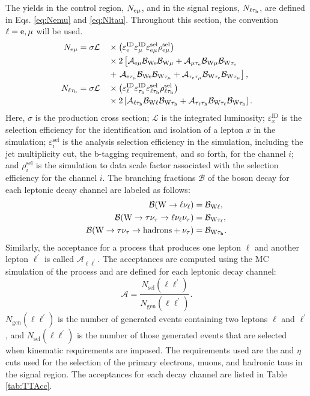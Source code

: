 The \ttbar yields in the \emu control region, $N_{\mathrm{e}\mu}$, and in the signal regions, $N_{\ell\tau_{\text{h}}}$, are defined in Eqs. \eqref{eq:Nemu} and \eqref{eq:Nltau}. Throughout this section, the convention $\ell = \mathrm{e}, \mu$ will be used.
\begin{alignat}{2}
\label{eq:Nemu}
  N_{\emu} &= \sigma \mathcal{L} &&\times \left(\Ee \Emu \varepsilon^{\text{sel}}_{\emu} \rho^{\text{sel}}_{\emu} \right)  \nonumber \\
           &                     &&\times 2 \left[\vphantom{\Btm} \Aem\Be\Bm + \Amte\Bm\Bte \right. \\
           &                     &&+ \left. \Aetm\Be\Btm  + \Atetm\Bte\Btm \right],  \nonumber \\
 N_{\ltau} &= \sigma \mathcal{L} &&\times \left(\El \Eth \varepsilon^{\text{sel}}_{\ltau} \rho^{\text{sel}}_{\ltau} \right) \nonumber \\
           &                     &&\times 2 \left[\Alth\Bl\Bth + \Atlth\Btl\Bth \right].  \label{eq:Nltau}
\end{alignat}
Here, $\sigma$ is the \ttbar production cross section; $\mathcal{L}$ is the integrated luminosity; $\varepsilon_{x}^{\text{ID}}$ is the selection efficiency for the identification and isolation of a lepton $x$ in the simulation; $\varepsilon^{\text{sel}}_{i}$ is the analysis selection efficiency in the simulation, including the jet multiplicity cut, the b-tagging requirement, and so forth, for the channel $i$; and $\rho^{\text{sel}}_{i}$ is the simulation to data scale factor associated with the selection efficiency for the channel $i$. The branching fractions $\mathcal{B}$ of the \W boson decay for each leptonic decay channel are labeled as follows:
\begin{align}
\mathcal{B}(\mathrm{W} \rightarrow \ell \nu_{\ell}) &= \mathcal{B}_{\mathrm{W}\ell}, \\
\mathcal{B}(\mathrm{W} \rightarrow \tau\nu_{\tau} \rightarrow \ell \nu_{\ell} \nu_{\tau}) &= \mathcal{B}_{\mathrm{W}\tau_{\ell}}, \\
\mathcal{B}(\mathrm{W} \rightarrow \tau\nu_{\tau} \rightarrow \text{hadrons} + \nu_{\tau}) &= \mathcal{B}_{\mathrm{W}\tau_{\text{h}}}.
\end{align}
Similarly, the acceptance for a process that produces one lepton $\ell$ and another lepton $\ell^{\prime}$ is called $\mathcal{A}_{\ell\ell^{\prime}}$. The acceptances are computed using the MC simulation of the \ttbar process and are defined for each leptonic decay channel:
\begin{equation}
  \mathcal{A} = \frac{N_{\text{sel}}(\ell\ell^{\prime})}{N_{\text{gen}}(\ell\ell^{\prime})}.
\end{equation}
$N_{\text{gen}}(\ell\ell^{\prime})$ is the number of generated events containing two leptons $\ell$ and $\ell^{\prime}$, and $N_{\text{sel}}(\ell\ell^{\prime})$ is the number of those generated events that are selected when kinematic requirements are imposed. The requirements used are the \pt and $\eta$ cuts used for the selection of the primary electrons, muons, and hadronic taus in the signal region. The acceptances for each decay channel are listed in Table \ref{tab:TTAcc}.

